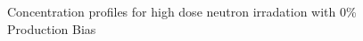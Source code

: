 \documentclass[a4paper]{article}
\begin{document}
      \begin{figure}[h!]  %
        \centering
        \qquad
        \caption{Concentration profiles for high dose neutron irradation with 0\% Production Bias}
        \label{figure:concentrations_neutron_0_1e-3}
      \end{figure}
\end{document}
